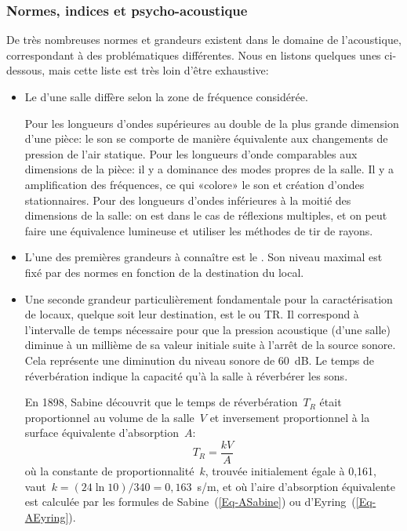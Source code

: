 \medskip
\subsubsection{Normes, indices et psycho-acoustique}

De très nombreuses normes et grandeurs existent dans le domaine de l'acoustique, correspondant à des problématiques différentes. Nous en listons quelques unes ci-dessous, mais cette liste est très loin d'être exhaustive:
\begin{itemize}
   \item Le  d'une salle diffère selon la zone de fréquence considérée.
   
Pour les longueurs d'ondes supérieures au double de la plus grande dimension d'une pièce: le son se comporte de manière équivalente aux changements de pression de l'air statique.
Pour les longueurs d'onde comparables aux dimensions de la pièce: il y a dominance des modes propres de la salle. Il y a amplification des fréquences, ce qui «colore» le son et création d'ondes stationnaires.
Pour des longueurs d'ondes inférieures à la moitié des dimensions de la salle: on est dans le cas de réflexions multiples, et on peut faire une équivalence lumineuse et utiliser les méthodes de tir de rayons.

   \item L'une des premières grandeurs à connaître est le . Son niveau maximal est fixé par des normes en fonction de la destination du local.

   \item Une seconde grandeur particulièrement fondamentale pour la caractérisation de locaux, quelque soit leur destination, est le  ou TR.  Il correspond à l'intervalle de temps nécessaire pour que la pression acoustique (d'une salle) diminue à un millième de sa valeur initiale suite à l'arrêt de la source sonore. Cela représente une diminution du niveau sonore de 60~dB. Le temps de réverbération indique la capacité qu'à la salle à réverbérer les sons.
   
En 1898, Sabine découvrit que le temps de réverbération~$T_R$ était proportionnel au volume de la salle~$V$ et inversement proportionnel à la surface équivalente d'absorption~$A$:
   \begin{equation}
    T_R = \frac{k V}{A} 
   \end{equation}
où la constante de proportionnalité~$k$, trouvée initialement égale à 0,161, vaut~$k=(24\ln10)/340 =0,163$~s/m, et où l'aire d'absorption équivalente est calculée par les formules de Sabine~(\ref{Eq-ASabine}) ou d'Eyring~(\ref{Eq-AEyring}).


\end{itemize}
